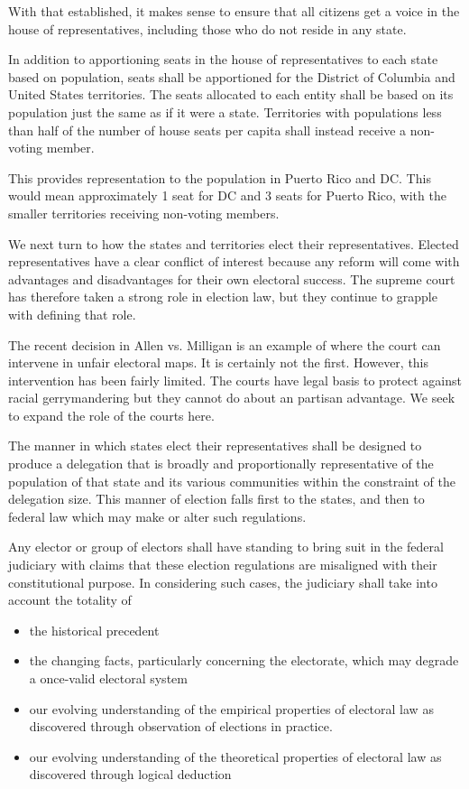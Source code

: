 \documentclass{article}
\begin{document}
With that established, it makes sense to ensure that all citizens get a voice in the house of representatives, including those who do not reside in any state.

\begin{quoting}
In addition to apportioning seats in the house of representatives to each state based on population, seats shall be apportioned for the District of Columbia and United States territories. The seats allocated to each entity shall be based on its population just the same as if it were a state. Territories with populations less than half of the number of house seats per capita shall instead receive a non-voting member.
\end{quoting}

This provides representation to the population in Puerto Rico and DC. This would mean approximately 1 seat for DC and 3 seats for Puerto Rico, with the smaller territories receiving non-voting members.

We next turn to how the states and territories elect their representatives. Elected representatives have a clear conflict of interest because any reform will come with advantages and disadvantages for their own electoral success. The supreme court has therefore taken a strong role in election law, but they continue to grapple with defining that role.

The recent decision in Allen vs. Milligan\cite{Allen_Milligan} is an example of where the court can intervene in unfair electoral maps. It is certainly not the first. However, this intervention has been fairly limited\cite{Brewer}. The courts have legal basis to protect against racial gerrymandering but they cannot do about an partisan advantage. We seek to expand the role of the courts here.

\begin{quoting}
The manner in which states elect their representatives shall be designed to produce a delegation that is broadly and proportionally representative of the population of that state and its various communities within the constraint of the delegation size. This manner of election falls first to the states, and then to federal law which may make or alter such regulations.

Any elector or group of electors shall have standing to bring suit in the federal judiciary with claims that these election regulations are misaligned with their constitutional purpose. In considering such cases, the judiciary shall take into account the totality of
\begin{itemize}
\item the historical precedent
\item the changing facts, particularly concerning the electorate, which may degrade a once-valid electoral system
\item our evolving understanding of the empirical properties of electoral law as discovered through observation of elections in practice.
\item our evolving understanding of the theoretical properties of electoral law as discovered through logical deduction
\end{itemize}
\end{quoting}
\end{document}
